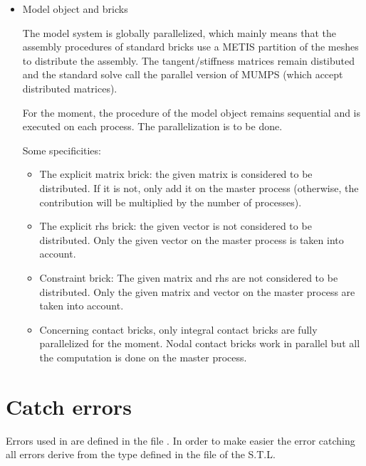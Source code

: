 \documentclass[a4paper,11pt,english]{sphinxmanual}
\begin{document}
\begin{itemize}
\item {} 
Model object and bricks

The model system is globally parallelized, which mainly means that the
assembly procedures of standard bricks use a METIS partition of the
meshes to distribute the assembly. The tangent/stiffness matrices
remain distibuted and the standard solve call the parallel version
of MUMPS (which accept distributed matrices).

For the moment, the procedure  of the model
object remains sequential and is executed on each process.
The parallelization is to be done.

Some specificities:
\begin{itemize}
\item {} 
The explicit matrix brick: the given matrix is considered to be
distributed. If it is not, only add it on the master process (otherwise,
the contribution will be multiplied by the number of processes).

\item {} 
The explicit rhs brick: the given vector is not considered to be
distributed. Only the given vector on the master process is taken into
account.

\item {} 
Constraint brick: The given matrix and rhs are not considered to be
distributed. Only the given matrix and vector on the master process are
taken into account.

\item {} 
Concerning contact bricks, only integral contact bricks are fully
parallelized for the moment. Nodal contact bricks work in parallel
but all the computation is done on the master process.

\end{itemize}

\end{itemize}


\chapter{Catch errors}
\label{\detokenize{userdoc/catch:catch-errors}}\label{\detokenize{userdoc/catch:ud-catch}}\label{\detokenize{userdoc/catch::doc}}
Errors used in  are defined in the file . In order to
make easier the error catching all errors derive from the type
 defined in the file  of the S.T.L.
\end{document}

